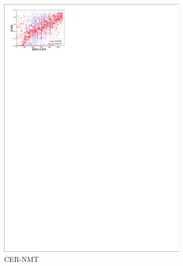 \begin{figure}[!htbp]
\begin{subfigure}[b]{0.5\textwidth}
      \includegraphics[width=\textwidth]{Img/fig_4_fidelity_cer_baseorder.pdf}
      \caption{CER-NMT}
      \label{fig:4_fidelity_cer_baseorder}
    \end{subfigure}
    \\%
    \begin{subfigure}[b]{0.5\textwidth}

\end{subfigure}
\end{figure}
